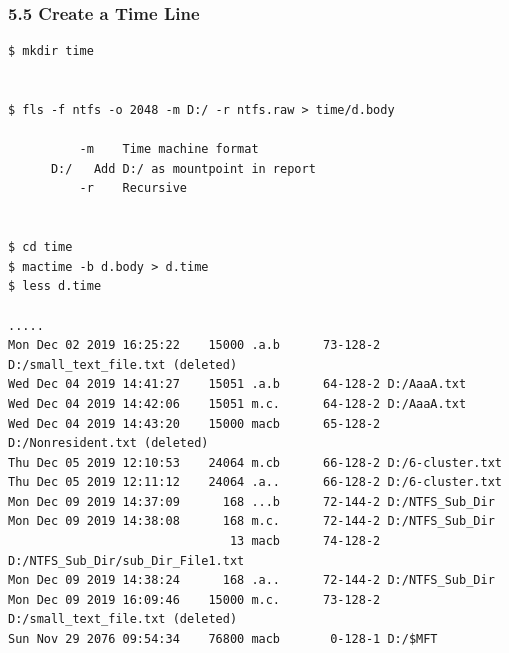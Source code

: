 \begin{frame}[fragile]
\frametitle{5.5 Create a Time Line}
  \begin{lstlisting}[basicstyle=\tiny]
$ mkdir time


$ fls -f ntfs -o 2048 -m D:/ -r ntfs.raw > time/d.body

          -m    Time machine format
	  D:/   Add D:/ as mountpoint in report
          -r    Recursive


$ cd time
$ mactime -b d.body > d.time
$ less d.time

.....
Mon Dec 02 2019 16:25:22    15000 .a.b      73-128-2 D:/small_text_file.txt (deleted)
Wed Dec 04 2019 14:41:27    15051 .a.b      64-128-2 D:/AaaA.txt
Wed Dec 04 2019 14:42:06    15051 m.c.      64-128-2 D:/AaaA.txt
Wed Dec 04 2019 14:43:20    15000 macb      65-128-2 D:/Nonresident.txt (deleted)
Thu Dec 05 2019 12:10:53    24064 m.cb      66-128-2 D:/6-cluster.txt
Thu Dec 05 2019 12:11:12    24064 .a..      66-128-2 D:/6-cluster.txt
Mon Dec 09 2019 14:37:09      168 ...b      72-144-2 D:/NTFS_Sub_Dir
Mon Dec 09 2019 14:38:08      168 m.c.      72-144-2 D:/NTFS_Sub_Dir
                               13 macb      74-128-2 D:/NTFS_Sub_Dir/sub_Dir_File1.txt
Mon Dec 09 2019 14:38:24      168 .a..      72-144-2 D:/NTFS_Sub_Dir
Mon Dec 09 2019 16:09:46    15000 m.c.      73-128-2 D:/small_text_file.txt (deleted)
Sun Nov 29 2076 09:54:34    76800 macb       0-128-1 D:/$MFT
  \end{lstlisting}
\end{frame}




